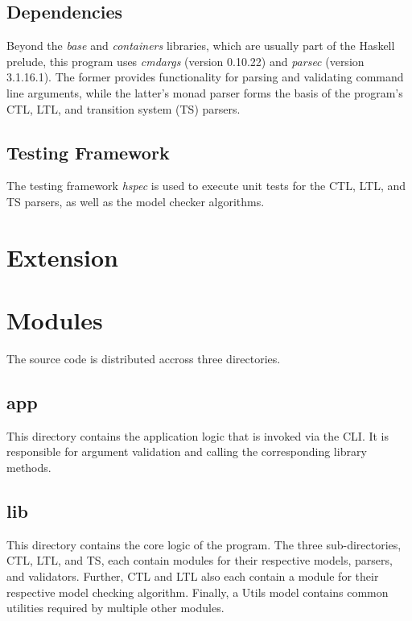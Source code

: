 \documentclass[11pt]{article}
\begin{document}
\subsection{Dependencies}

Beyond the \textit{base} and \textit{containers} libraries, which are usually part of the Haskell prelude, this program uses \textit{cmdargs} (version 0.10.22) and \textit{parsec} (version 3.1.16.1).
The former provides functionality for parsing and validating command line arguments, while the latter's monad parser forms the basis of the program's CTL, LTL, and transition system (TS) parsers.


\subsection{Testing Framework}

The testing framework \textit{hspec} is used to execute unit tests for the CTL, LTL, and TS parsers, as well as the model checker algorithms.

\section{Extension}


\section{Modules}

The source code is distributed accross three directories.

\subsection{app}

This directory contains the application logic that is invoked via the CLI.
It is responsible for argument validation and calling the corresponding library methods.

\subsection{lib}

This directory contains the core logic of the program.
The three sub-directories, CTL, LTL, and TS, each contain modules for their respective models, parsers, and validators.
Further, CTL and LTL also each contain a module for their respective model checking algorithm.
Finally, a Utils model contains common utilities required by multiple other modules. 
\end{document}
